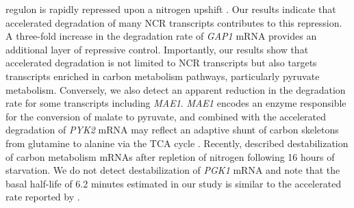 {regulon is rapidly repressed upon a nitrogen upshift
\parencite{airoldi2016steady}. Our
results indicate that accelerated degradation of 
many NCR transcripts \parencite{godard2007effect} contributes to this
repression. 
A three-fold increase in
the degradation rate of \textit{GAP1} mRNA provides an additional layer of
repressive control. Importantly, our results show that accelerated
degradation is not limited to NCR transcripts but also targets
transcripts enriched in carbon metabolism pathways, particularly
pyruvate metabolism. Conversely, we also detect an apparent reduction in the 
degradation rate for some transcripts 
including \textit{MAE1}. \textit{MAE1} encodes
an enzyme responsible for the conversion of malate to pyruvate, and
combined with the accelerated degradation of \textit{PYK2} mRNA 
may reflect an adaptive shunt of carbon skeletons from glutamine 
to alanine via the TCA cycle \parencite{boles1998identification}. 
Recently, \cite{tesniere2017relief}
described destabilization  of carbon metabolism mRNAs after repletion
of nitrogen following 16 hours of starvation. We do
not detect destabilization of \textit{PGK1} mRNA and note that
the basal half-life of 6.2 minutes estimated in our study is similar
to the accelerated rate reported by \cite{tesniere2017relief}.


}
